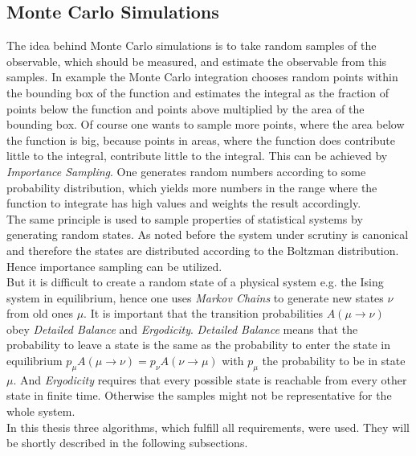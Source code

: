 \subsection{Monte Carlo Simulations}
\label{ssec:montecarlo}
    The idea behind Monte Carlo simulations is to take random samples of
    the observable, which should be measured, and estimate the observable from
    this samples. In example the Monte Carlo integration chooses random
    points within the bounding box of the function and estimates the integral
    as the fraction of points below the function and points above multiplied
    by the area of the bounding box.
    Of course one wants to sample more points, where the area below the
    function is big, because points in areas, where the function does
    contribute little to the integral, contribute little to the integral.
    This can be achieved by \emph{Importance Sampling}. One
    generates random numbers according to some probability distribution, which
    yields more numbers in the range where the function to integrate has high
    values and weights the result accordingly.\\
    The same principle is used to sample properties of statistical
    systems by generating random states.
    As noted before the system under scrutiny is canonical and therefore
    the states are distributed according to the Boltzman distribution.
    Hence importance sampling can be utilized.\\
    But it is difficult to create a random state of a physical system e.g. the
    Ising system in equilibrium, hence one uses \emph{Markov Chains} to
    generate new states \(\nu\) from old ones \(\mu\).
    It is important that the transition probabilities \(A(\mu \to \nu)\)
    obey \emph{Detailed Balance} and \emph{Ergodicity}.
    \emph{Detailed Balance} means that the probability to leave a state is
    the same as the probability to enter the state in equilibrium
    \(p_\mu A(\mu \to \nu) = p_\nu A(\nu \to \mu)\) with \(p_\mu\) the
    probability to be in state \(\mu\).
    And \emph{Ergodicity} requires that every possible state is reachable
    from every other state in finite time. \cite{NewmanBarkema1999} \cite{Katzgraber2011}
    Otherwise the samples might not be representative for the whole system.\\
    In this thesis three algorithms, which fulfill all requirements,
    were used. They will be shortly described in the following subsections.

